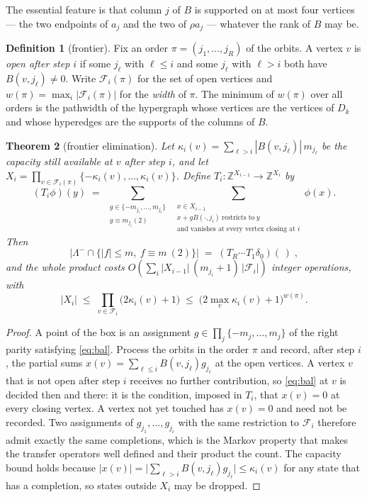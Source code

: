 \documentclass[11pt]{article}
\theoremstyle{plain}
\newtheorem{theorem}{Theorem}
\theoremstyle{definition}
\newtheorem{definition}[theorem]{Definition}
\theoremstyle{remark}
\newcommand{\Z}{\mathbb{Z}}
\newcommand{\Lm}{\Lambda^{-}}
\newcommand{\Fr}{\mathcal{F}}
\begin{document}
The essential feature is that column $j$ of $B$ is supported on at most four vertices --- the
two endpoints of $a_j$ and the two of $\rho a_j$ --- whatever the rank of $B$ may be.

\begin{definition}[frontier]\label{def:front}
Fix an order $\pi=(j_1,\dots,j_R)$ of the orbits. A vertex $v$ is \emph{open after step $i$}
if some $j_\ell$ with $\ell\le i$ and some $j_\ell$ with $\ell>i$ both have $B(v,j_\ell)\ne0$.
Write $\Fr_i(\pi)$ for the set of open vertices and $w(\pi)=\max_i|\Fr_i(\pi)|$ for the
\emph{width} of $\pi$. The minimum of $w(\pi)$ over all orders is the pathwidth of the
hypergraph whose vertices are the vertices of $D_k$ and whose hyperedges are the supports of
the columns of $B$.
\end{definition}

\begin{theorem}[frontier elimination]\label{thm:elim}
Let $\kappa_i(v)=\sum_{\ell>i}|B(v,j_\ell)|\,m_{j_\ell}$ be the capacity still available at
$v$ after step $i$, and let
$X_i=\prod_{v\in\Fr_i(\pi)}\{-\kappa_i(v),\dots,\kappa_i(v)\}$.
Define $T_i\colon \Z^{X_{i-1}}\to\Z^{X_i}$ by
\[
(T_i\phi)(y)\;=\;\sum_{\substack{g\in\{-m_{j_i},\dots,m_{j_i}\}\\ g\equiv m_{j_i}(2)}}
\ \sum_{\substack{x\in X_{i-1}\\ x+gB(\cdot,j_i)\ \text{restricts to}\ y\\
\text{and vanishes at every vertex closing at }i}}\phi(x).
\]
Then
\[
\big|\Lm\cap\{|f|\le m,\ f\equiv m\ (2)\}\big|\;=\;(T_R\cdots T_1\delta_0)(\,)\;,
\]
and the whole product costs $O\!\left(\sum_i |X_{i-1}|\,(m_{j_i}+1)\,|\Fr_i|\right)$ integer
operations, with
\[
|X_i|\;\le\;\prod_{v\in\Fr_i}\big(2\kappa_i(v)+1\big)
\;\le\;\big(2\max_v\kappa_i(v)+1\big)^{w(\pi)} .
\]
\end{theorem}

\begin{proof}
A point of the box is an assignment $g\in\prod_j\{-m_j,\dots,m_j\}$ of the right parity
satisfying \eqref{eq:bal}. Process the orbits in the order $\pi$ and record, after step $i$,
the partial sums $x(v)=\sum_{\ell\le i}B(v,j_\ell)g_{j_\ell}$ at the open vertices. A vertex
$v$ that is not open after step $i$ receives no further contribution, so \eqref{eq:bal} at $v$
is decided then and there: it is the condition, imposed in $T_i$, that $x(v)=0$ at every
closing vertex. A vertex not yet touched has $x(v)=0$ and need not be recorded. Two
assignments of $g_{j_1},\dots,g_{j_i}$ with the same restriction to $\Fr_i$ therefore admit
exactly the same completions, which is the Markov property that makes the transfer operators
well defined and their product the count. The capacity bound holds because
$|x(v)|=\big|\sum_{\ell>i}B(v,j_\ell)g_{j_\ell}\big|\le\kappa_i(v)$ for any state that has a
completion, so states outside $X_i$ may be dropped.
\end{proof}
\end{document}

